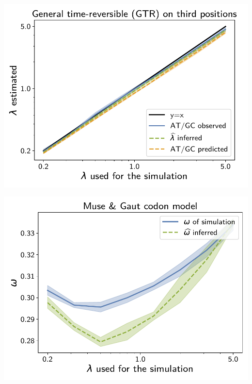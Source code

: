 \documentclass{article}
\begin{document}
\begin{center}
    \begin{minipage}{0.325\linewidth}
        \includegraphics[width=\linewidth, page=1]{inference_supp_mat/MammalsExons10Mu1.0_lambda_GTR.pdf}
    \end{minipage}
    \hfill
    \begin{minipage}{0.325\linewidth}
        \includegraphics[width=\linewidth, page=1]{inference_supp_mat/MammalsExons10Mu1.0_omega_MG.pdf}
    \end{minipage}
    \begin{minipage}{0.325\linewidth}

\end{minipage}
\end{center}
\end{document}
